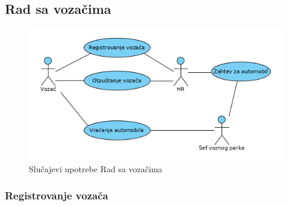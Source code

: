 \subsection{\bfseries Rad sa vozačima}

\begin{figure}[H]
\begin{center}
\includegraphics[width=\textwidth]{Slike/RadSaVozacimaUseCase.png}
\end{center}
    \caption{Slučajevi upotrebe Rad sa vozačima}
\label{fig:contextDiagram}
\end{figure}


\subsubsection{\bfseries Registrovanje vozača}

